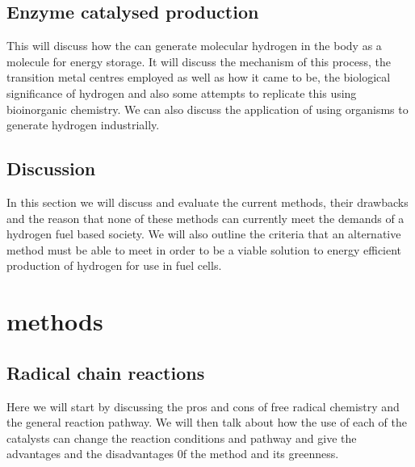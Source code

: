 \documentclass[a4paper]{article}
\begin{document}
\subsection{Enzyme catalysed production}%
\label{sub:enzyme_catalysed_production}

This will discuss how the  can generate molecular hydrogen in the body as a molecule for energy storage. 
It will discuss the mechanism of this process, the transition metal centres employed as well as how it came to be, the biological significance of hydrogen and also some attempts to replicate this using bioinorganic chemistry.
We can also discuss the application of using organisms to generate hydrogen industrially.

\subsection{Discussion}%
\label{sub:discussion_trad}
In this section we will discuss and evaluate the current methods, their drawbacks and the reason that none of these methods can currently meet the demands of a hydrogen fuel based society.
We will also outline the criteria that an alternative method must be able to meet in order to be a viable solution to energy efficient production of hydrogen for use in fuel cells.

\section{ methods}%
\label{sub:ch4_methods}




\subsection{Radical chain reactions}%
\label{sub:Radical_chain_reactions}
Here we will start by discussing the pros and cons of free radical chemistry and the general reaction pathway. 
We will then talk about how the use of each of the catalysts can change the reaction conditions and pathway and give the advantages and the disadvantages 0f the method and its greenness.
\end{document}
